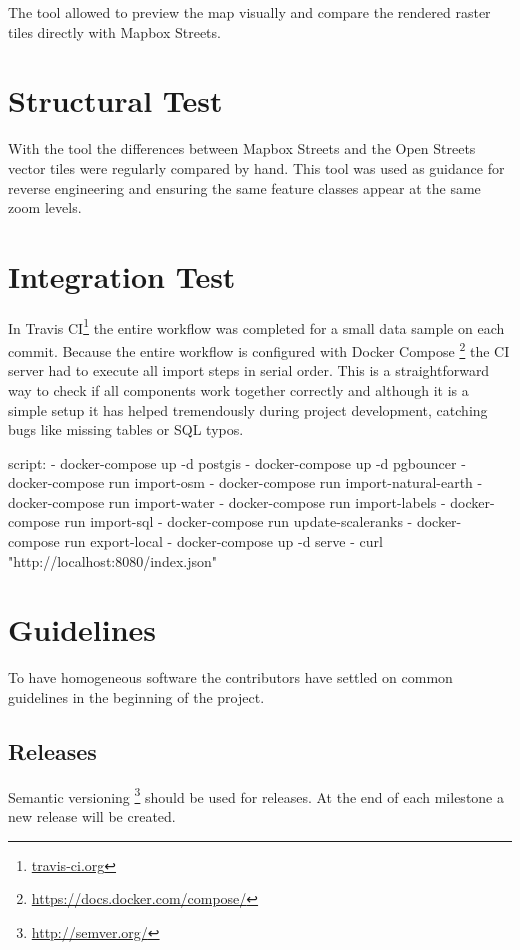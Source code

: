The  tool allowed to preview the map visually and compare the rendered raster tiles directly with Mapbox Streets.

\section{Structural Test}

With the  tool the differences between Mapbox Streets and the Open Streets vector tiles were regularly compared by hand. This tool was used as guidance for reverse engineering and ensuring the same feature classes appear at the same zoom levels.

\section{Integration Test}

In Travis CI\footnote{\url{travis-ci.org}}  the entire workflow was completed for a small data sample on each commit.
Because the entire workflow is configured with Docker Compose \footnote{\url{https://docs.docker.com/compose/}} the CI server had to execute all import steps in serial order. This is a straightforward way to check if all components work together correctly
and although it is a simple setup it has helped tremendously during project development, catching bugs
like missing tables or SQL typos.

\begin{yamlcode}
script:
  - docker-compose up -d postgis
  - docker-compose up -d pgbouncer
  - docker-compose run import-osm
  - docker-compose run import-natural-earth
  - docker-compose run import-water
  - docker-compose run import-labels
  - docker-compose run import-sql
  - docker-compose run update-scaleranks
  - docker-compose run export-local
  - docker-compose up -d serve
  - curl "http://localhost:8080/index.json"
\end{yamlcode}



\section{Guidelines}\label{guidelines}
To have homogeneous software the contributors have settled on common guidelines in the beginning of the project.

\subsection{Releases}
Semantic versioning \footnote{\url{http://semver.org/}} should be used for releases.
At the end of each milestone a new release will be created.

